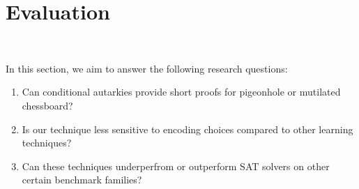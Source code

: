 \section{Evaluation}~\label{sec:evaluation}

In this section, we aim to answer the following research questions:


\begin{enumerate}
    \item Can conditional autarkies provide short \pr proofs for pigeonhole or mutilated chessboard?
    \item Is our technique less sensitive to encoding choices compared to other
    \pr learning techniques?
    \item Can these techniques underperfrom or outperform SAT solvers on other certain benchmark
    families?
\end{enumerate}








